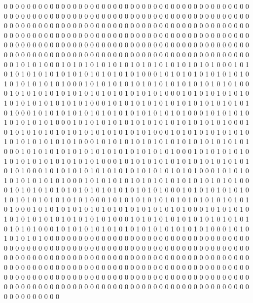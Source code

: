 0 0 0 0 0 0 0 0 0 0 0 0 0 0 0 0 0 0 0 0 0 0 0 0 0 0 0 0 0 0 0 0 0 0 0 0 0 0 0 0 0 0 0 0 0 0 0 0 0 0 0 0 0 0 0 0 0 0 0 0 0 0 0 0 0 0 0 0 0 0 0 0 0 0 0 0 0 0 0 0 0 0 0 0 0 0 0 0 0 0 0 0 0 0 0 0 0 0 0 0 0 0 0 0 0 0 0 0 0 0 0 0 0 0 0 0 0 0 0 0 0 0 0 0 0 0 0 0 0 0 0 0 0 0 0 0 0 0 0 0 0 0 0 0 0 0 0 0 0 0 0 0 0 0 0 0 0 0 0 0 0 0 0 0 0 0 0 0 0 0 0 0 0 0 0 0 0 0 0 0 0 0 0 0 0 0 0 0 0 0 0 0 0 0 0 0 0 0 0 0 0 0 0 0 0 0 0 0 0 0 0 0 0 0 0 0 0 0 0 0 0 0 0 0 0 0 0 0 0 0 0 0 0 0 0 0 0 0 0 0 0 0 0 0 0 0 0 0 0 0 0 0 0 0 0 0 0 0 0 0 
1 0 1 0 1 0 0 0 1 0 1 0 1 0 1 0 1 0 1 0 1 0 1 0 1 0 1 0 1 0 1 0 1 0 1 0 0 0 1 0 1 0 1 0 1 0 1 0 1 0 1 0 1 0 1 0 1 0 1 0 1 0 1 0 1 0 0 0 1 0 1 0 1 0 1 0 1 0 1 0 1 0 1 0 1 0 1 0 1 0 1 0 1 0 1 0 0 0 1 0 1 0 1 0 1 0 1 0 1 0 1 0 1 0 1 0 1 0 1 0 1 0 1 0 1 0 0 0 1 0 1 0 1 0 1 0 1 0 1 0 1 0 1 0 1 0 1 0 1 0 1 0 1 0 1 0 0 0 1 0 1 0 1 0 1 0 1 0 1 0 1 0 1 0 1 0 1 0 1 0 1 0 1 0 1 0 0 0 1 0 1 0 1 0 1 0 1 0 1 0 1 0 1 0 1 0 1 0 1 0 1 0 1 0 1 0 0 0 1 0 1 0 1 0 1 0 1 0 1 0 1 0 1 0 1 0 1 0 1 0 1 0 1 0 1 0 0 0 1 0 1 0 1 0 1 0 1 0 1 0 
1 0 1 0 1 0 0 0 1 0 1 0 1 0 1 0 1 0 1 0 1 0 1 0 1 0 1 0 1 0 1 0 1 0 1 0 0 0 1 0 1 0 1 0 1 0 1 0 1 0 1 0 1 0 1 0 1 0 1 0 1 0 1 0 1 0 0 0 1 0 1 0 1 0 1 0 1 0 1 0 1 0 1 0 1 0 1 0 1 0 1 0 1 0 1 0 0 0 1 0 1 0 1 0 1 0 1 0 1 0 1 0 1 0 1 0 1 0 1 0 1 0 1 0 1 0 0 0 1 0 1 0 1 0 1 0 1 0 1 0 1 0 1 0 1 0 1 0 1 0 1 0 1 0 1 0 0 0 1 0 1 0 1 0 1 0 1 0 1 0 1 0 1 0 1 0 1 0 1 0 1 0 1 0 1 0 0 0 1 0 1 0 1 0 1 0 1 0 1 0 1 0 1 0 1 0 1 0 1 0 1 0 1 0 1 0 0 0 1 0 1 0 1 0 1 0 1 0 1 0 1 0 1 0 1 0 1 0 1 0 1 0 1 0 1 0 0 0 1 0 1 0 1 0 1 0 1 0 1 0 
1 0 1 0 1 0 0 0 1 0 1 0 1 0 1 0 1 0 1 0 1 0 1 0 1 0 1 0 1 0 1 0 1 0 1 0 0 0 1 0 1 0 1 0 1 0 1 0 1 0 1 0 1 0 1 0 1 0 1 0 1 0 1 0 1 0 0 0 1 0 1 0 1 0 1 0 1 0 1 0 1 0 1 0 1 0 1 0 1 0 1 0 1 0 1 0 0 0 1 0 1 0 1 0 1 0 1 0 1 0 1 0 1 0 1 0 1 0 1 0 1 0 1 0 1 0 0 0 1 0 1 0 1 0 1 0 1 0 1 0 1 0 1 0 1 0 1 0 1 0 1 0 1 0 1 0 0 0 1 0 1 0 1 0 1 0 1 0 1 0 1 0 1 0 1 0 1 0 1 0 1 0 1 0 1 0 0 0 1 0 1 0 1 0 1 0 1 0 1 0 1 0 1 0 1 0 1 0 1 0 1 0 1 0 1 0 0 0 1 0 1 0 1 0 1 0 1 0 1 0 1 0 1 0 1 0 1 0 1 0 1 0 1 0 1 0 0 0 1 0 1 0 1 0 1 0 1 0 1 0 
0 0 0 0 0 0 0 0 0 0 0 0 0 0 0 0 0 0 0 0 0 0 0 0 0 0 0 0 0 0 0 0 0 0 0 0 0 0 0 0 0 0 0 0 0 0 0 0 0 0 0 0 0 0 0 0 0 0 0 0 0 0 0 0 0 0 0 0 0 0 0 0 0 0 0 0 0 0 0 0 0 0 0 0 0 0 0 0 0 0 0 0 0 0 0 0 0 0 0 0 0 0 0 0 0 0 0 0 0 0 0 0 0 0 0 0 0 0 0 0 0 0 0 0 0 0 0 0 0 0 0 0 0 0 0 0 0 0 0 0 0 0 0 0 0 0 0 0 0 0 0 0 0 0 0 0 0 0 0 0 0 0 0 0 0 0 0 0 0 0 0 0 0 0 0 0 0 0 0 0 0 0 0 0 0 0 0 0 0 0 0 0 0 0 0 0 0 0 0 0 0 0 0 0 0 0 0 0 0 0 0 0 0 0 0 0 0 0 0 0 0 0 0 0 0 0 0 0 0 0 0 0 0 0 0 0 0 0 0 0 0 0 0 0 0 0 0 0 0 0 0 0 0 0 0 0 0 0 0 0 
